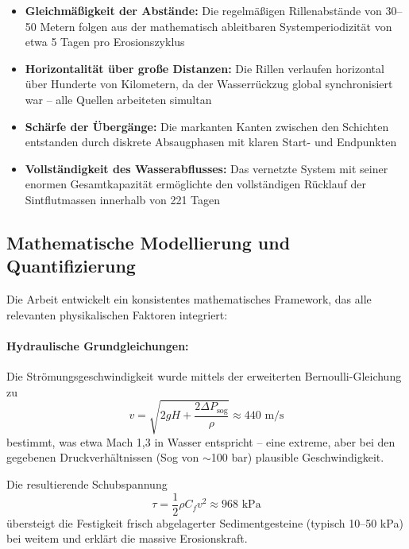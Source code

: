 ﻿\documentclass[12pt,a4paper]{report}
\begin{document}
\begin{itemize}
	\item \textbf{Gleichmäßigkeit der Abstände:} Die regelmäßigen Rillenabstände von 30--50 Metern folgen aus der mathematisch ableitbaren Systemperiodizität von etwa 5 Tagen pro Erosionszyklus
	
	\item \textbf{Horizontalität über große Distanzen:} Die Rillen verlaufen horizontal über Hunderte von Kilometern, da der Wasserrückzug global synchronisiert war -- alle Quellen arbeiteten simultan
	
	\item \textbf{Schärfe der Übergänge:} Die markanten Kanten zwischen den Schichten entstanden durch diskrete Absaugphasen mit klaren Start- und Endpunkten
	
	\item \textbf{Vollständigkeit des Wasserabflusses:} Das vernetzte System mit seiner enormen Gesamtkapazität ermöglichte den vollständigen Rücklauf der Sintflutmassen innerhalb von 221 Tagen
\end{itemize}

\subsection{Mathematische Modellierung und Quantifizierung}

Die Arbeit entwickelt ein konsistentes mathematisches Framework, das alle relevanten physikalischen Faktoren integriert:

\paragraph{Hydraulische Grundgleichungen:}
Die Strömungsgeschwindigkeit wurde mittels der erweiterten Bernoulli-Gleichung zu
\begin{equation}
	v = \sqrt{2gH + \frac{2\Delta P_{\text{sog}}}{\rho}} \approx 440 \text{ m/s}
\end{equation}
bestimmt, was etwa Mach 1,3 in Wasser entspricht -- eine extreme, aber bei den gegebenen Druckverhältnissen (Sog von $\sim$100 bar) plausible Geschwindigkeit.

Die resultierende Schubspannung
\begin{equation}
	\tau = \frac{1}{2}\rho C_f v^2 \approx 968 \text{ kPa}
\end{equation}
übersteigt die Festigkeit frisch abgelagerter Sedimentgesteine (typisch 10--50 kPa) bei weitem und erklärt die massive Erosionskraft.
\end{document}
